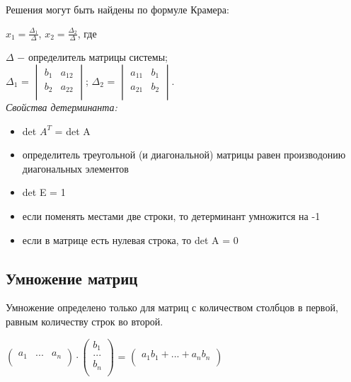 	Решения могут быть найдены по $\textit{формуле Крамера}$:
	
	\begin{center}
	$	x_1 =\frac{\Delta_1}{\Delta}$, $x_2 = \frac{\Delta_2}{\Delta}$, где
	\end{center}
	$\Delta$ $-$ определитель матрицы системы;\\
	$\Delta_1$ = 
	$\begin{vmatrix}
		b_1 & a_{12}\\
		b_2 & a_{22}\\
	\end{vmatrix}$;
	$\Delta_2$ = 
	$\begin{vmatrix}
		a_{11} & b_1\\
		a_{21} & b_2\\
	\end{vmatrix}$.\\
	

 
	
	\textit{Свойства детерминанта:}
	\begin{itemize}
		\item det $A^T$ = det A
		\item определитель треугольной (и диагональной) матрицы равен производонию диагональных элементов
		\item det E = 1
		\item если поменять местами две строки, то детерминант умножится на -1
		\item если в матрице есть нулевая строка, то det A = 0
	\end{itemize}
		
	\subsection{Умножение матриц}
	
	Умножение определено только для матриц с количеством столбцов в первой, равным количеству строк во второй.
	
	\begin{center}
		$\begin{pmatrix}
			a_1 & ... & a_n\\
	    \end{pmatrix}\cdot 
		\begin{pmatrix*}
			b_1\\
			...\\
			b_n\\
		\end{pmatrix*}$ = 
		$\begin{pmatrix*}
			a_1 b_1 + ... + a_n b_n\\
		\end{pmatrix*}$
	\end{center}
	

